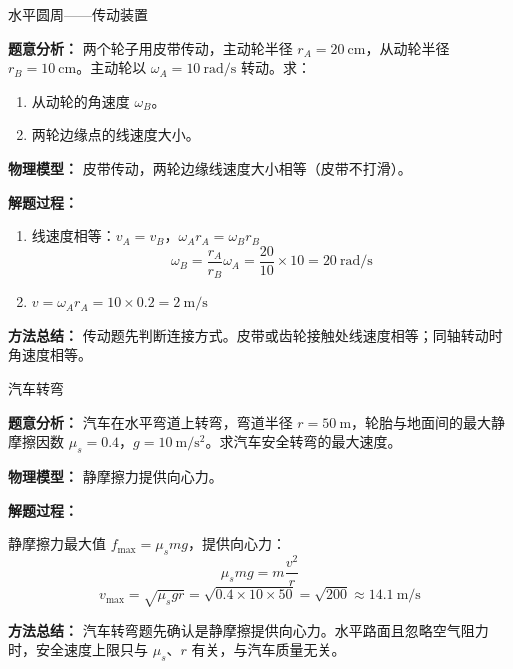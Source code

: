 \begin{examplebox}{水平圆周——传动装置}

\textbf{题意分析：} 两个轮子用皮带传动，主动轮半径 $r_A = 20\ \mathrm{cm}$，从动轮半径 $r_B = 10\ \mathrm{cm}$。主动轮以 $\omega_A = 10\ \mathrm{rad/s}$ 转动。求：
\begin{enumerate}
  \item 从动轮的角速度 $\omega_B$。
  \item 两轮边缘点的线速度大小。
\end{enumerate}

\textbf{物理模型：} 皮带传动，两轮边缘线速度大小相等（皮带不打滑）。

\begin{center}

\end{center}

\textbf{解题过程：}

\begin{enumerate}
  \item 线速度相等：$v_A = v_B$，$\omega_A r_A = \omega_B r_B$
  \[
  \omega_B = \frac{r_A}{r_B} \omega_A = \frac{20}{10} \times 10 = 20\ \mathrm{rad/s}
  \]

  \item $v = \omega_A r_A = 10 \times 0.2 = 2\ \mathrm{m/s}$
\end{enumerate}

\textbf{方法总结：} 传动题先判断连接方式。皮带或齿轮接触处线速度相等；同轴转动时角速度相等。

\end{examplebox}

\begin{examplebox}{汽车转弯}

\textbf{题意分析：} 汽车在水平弯道上转弯，弯道半径 $r = 50\ \mathrm{m}$，轮胎与地面间的最大静摩擦因数 $\mu_s = 0.4$，$g = 10\ \mathrm{m/s^2}$。求汽车安全转弯的最大速度。

\textbf{物理模型：} 静摩擦力提供向心力。

\begin{center}

\end{center}

\textbf{解题过程：}

静摩擦力最大值 $f_{\max} = \mu_s mg$，提供向心力：
\[
\mu_s mg = m\frac{v^2}{r}
\]
\[
v_{\max} = \sqrt{\mu_s g r} = \sqrt{0.4 \times 10 \times 50} = \sqrt{200} \approx 14.1\ \mathrm{m/s}
\]

\textbf{方法总结：} 汽车转弯题先确认是静摩擦提供向心力。水平路面且忽略空气阻力时，安全速度上限只与 $\mu_s$、$r$ 有关，与汽车质量无关。

\end{examplebox}

